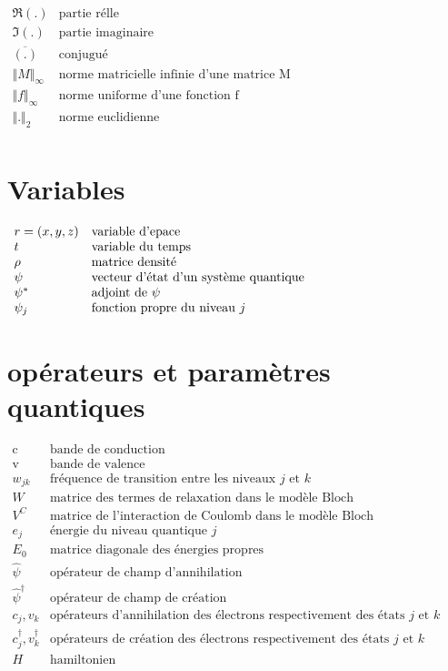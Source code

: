 \documentclass[12pt,a4paper,openany,oneside]{book}
\begin{document}
\section*{}
$\begin{array}{lll}
\Re{(.)}& \textrm {partie rélle} \\
\Im{(.)}& \textrm {partie imaginaire} \\
\overline{(.)}& \textrm {conjugué} \\
\Vert M \Vert_{\infty} & \textrm{norme matricielle infinie d'une matrice M}\\
\Vert f \Vert_{\infty} & \textrm{norme uniforme d'une fonction f}\\
\Vert . \Vert_{2} & \textrm{norme euclidienne }\\
\end{array}$
%
\section*{Variables}
\vspace{0.5cm}
$\begin{array}{lll}
r=(x,y,z) & \textrm{variable d'epace}\\
t & \textrm{variable du temps}\\
\rho & \textrm{matrice densité}\\
\psi  & \textrm{vecteur d'état d'un système quantique}\\
\psi^{*} & \textrm {adjoint de $\psi$} \\
\psi_{j} & \textrm{fonction propre du niveau $ j $}\\

\end{array}$
%
\section*{opérateurs et paramètres quantiques}
\vspace{0.5cm}
$\begin{array}{lll}
\textrm{c} & \textrm{bande de conduction}\\
\textrm{v}& \textrm{bande de valence} \\
w_{jk} & \textrm{fréquence de transition entre les niveaux $j$ et $k$} \\
W & \textrm{matrice des termes de relaxation dans le modèle Bloch}\\ 
V^{C} & \textrm{matrice de l'interaction de Coulomb dans le modèle Bloch}\\
e_{j} & \textrm{énergie du niveau quantique $j$ }\\
E_{0} & \textrm{matrice diagonale des énergies propres}\\
\hat{\psi} & \textrm{opérateur de champ d’annihilation}\\
\hat{\psi}^{\dagger} & \textrm{opérateur de champ de création}\\
c_{j}, v_{k} & \textrm{opérateurs d’annihilation des électrons respectivement des états $j$ et $k$}\\
c_{j}^{\dagger}, v_{k}^{\dagger} & \textrm{opérateurs de création des électrons respectivement des états $j$ et $k$}\\
H & \textrm{hamiltonien}\\
\end{array}$
%
\end{document}
